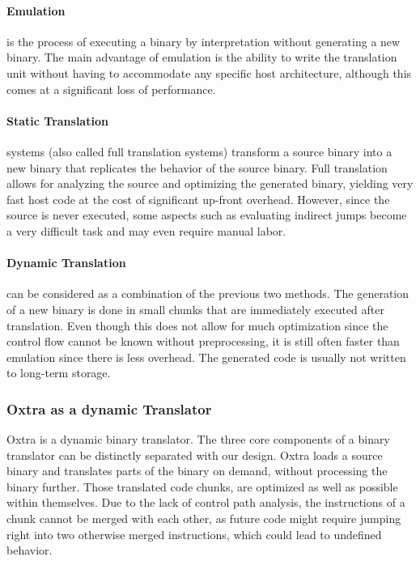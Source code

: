 	\paragraph{Emulation}
		is the process of executing a binary by interpretation without generating a new binary. The main advantage of emulation is the ability to write the translation unit without having to accommodate any specific host architecture, although this comes at a significant loss of performance.

	\paragraph{Static Translation}
		systems (also called full translation systems) transform a source binary into a new binary that replicates the behavior of the source binary. Full translation allows for analyzing the source and optimizing the generated binary, yielding very fast host code at the cost of significant up-front overhead. However, since the source is never executed, some aspects such as evaluating indirect jumps become a very difficult task and may even require manual labor.

	\paragraph{Dynamic Translation}
		can be considered as a combination of the previous two methods. The generation of a new binary is done in small chunks that are immediately executed after translation. Even though this does not allow for much optimization since the control flow cannot be known without preprocessing, it is still often faster than emulation since there is less overhead. The generated code is usually not written to long-term storage.
	
	\subsubsection{Oxtra as a dynamic Translator}
		Oxtra is a dynamic binary translator. The three core components of a binary translator can be distinctly separated with our design. Oxtra loads a source binary and translates parts of the binary on demand, without processing the binary further. Those translated code chunks, are optimized as well as possible within themselves. Due to the lack of control path analysis, the instructions of a chunk cannot be merged with each other, as future code might require jumping right into two otherwise merged instructions, which could lead to undefined behavior.

